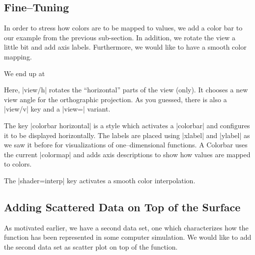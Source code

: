 \subsection{Fine--Tuning}
In order to stress how colors are to be mapped to values, we add a color bar to our example from the previous sub-section. In addition, we rotate the view a little bit and add axis labels. Furthermore, we would like to have a smooth color mapping.

We end up at
\pgfplotsexpensiveexample
\begin{codeexample}[]
\end{codeexample}
Here, |view/h| rotates the ``horizontal'' parts of the view (only). It chooses a new view angle for the orthographic projection. As you guessed, there is also a |view/v| key and a |view=| variant.

The key |colorbar horizontal| is a style which activates a |colorbar| and configures it to be displayed horizontally. The labels are placed using |xlabel| and |ylabel| as we saw it before for visualizations of one--dimensional functions. A Colorbar uses the current |colormap| and adds axis descriptions to show how values are mapped to colors.

The |shader=interp| key activates a smooth color interpolation.

\subsection{Adding Scattered Data on Top of the Surface}
As motivated earlier, we have a second data set, one which characterizes how the function has been represented in some computer simulation. We would like to add the second data set as scatter plot on top of the function. 

